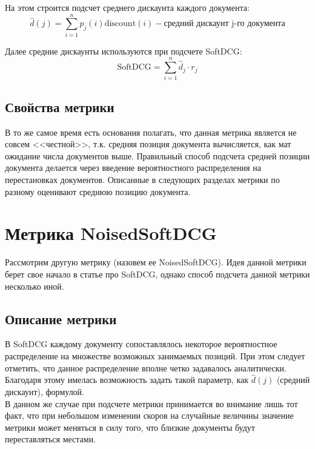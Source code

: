 \documentclass[14pt,a4paper]{amsart}
\theoremstyle{definition}
\theoremstyle{definition}
\newcommand{\Sum}{\sum\limits}
\renewcommand\t{\text}
\begin{document}
На этом строится подсчет среднего дискаунта каждого документа: $$\hat{d}(j) = \Sum_{i=1}^n p_j(i) \t{discount}(i) - \t{средний дискаунт j-го документа}$$

Далее средние дискаунты используются при подсчете SoftDCG: $$\t{SoftDCG} = \Sum_{i=1}^n \hat{d}_j \cdot r_j$$

\subsection{Свойства метрики}

В то же самое время есть основания полагать, что данная метрика является не совсем <<честной>>, т.к. средняя позиция документа вычисляется, как мат ожидание числа документов выше. Правильный способ подсчета средней позиции документа делается через введение вероятностного распределения на перестановках документов. Описанные в следующих разделах метрики по разному оценивают среднюю позицию документа.


\newpage
\section{Метрика NoisedSoftDCG}

Рассмотрим другую метрику (назовем ее NoisedSoftDCG). Идея данной метрики берет свое начало в статье про SoftDCG, однако способ подсчета данной метрики несколько иной. \\

\subsection{Описание метрики}

В SoftDCG каждому документу сопоставлялось некоторое вероятностное распределение на множестве возможных занимаемых позиций. При этом следует отметить, что данное распределение вполне четко задавалось аналитически. Благодаря этому имелась возможность задать такой параметр, как $\hat{d}(j)$ (средний дискаунт), формулой. \\

В данном же случае при подсчете метрики принимается во внимание лишь тот факт, что при небольшом изменении скоров на случайные величины значение метрики может меняться в силу того, что близкие документы будут переставляться местами. \\
\end{document}
